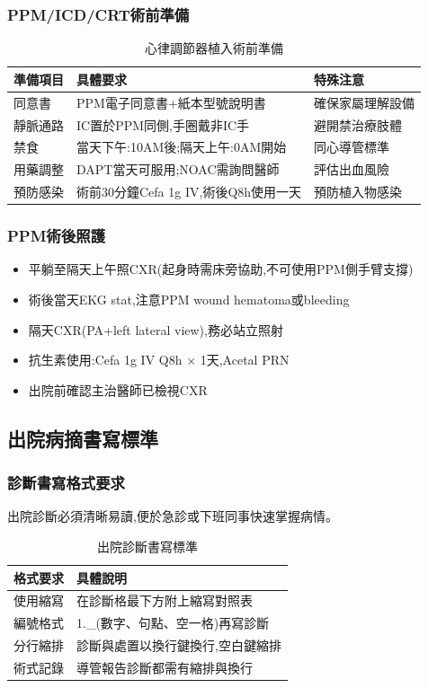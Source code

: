 \documentclass[12pt,a4paper]{article}
\begin{document}
\subsubsection{PPM/ICD/CRT術前準備}
\begin{table}[h]
    \centering
    \caption{心律調節器植入術前準備}
    \begin{tabular}{p{4cm} p{8cm} p{4cm}}
        \toprule
        \textbf{準備項目} & \textbf{具體要求} & \textbf{特殊注意} \\
        \midrule
        同意書 & PPM電子同意書+紙本型號說明書 & 確保家屬理解設備 \\
        靜脈通路 & IC置於PPM同側,手圈戴非IC手 & 避開禁治療肢體 \\
        禁食 & 當天下午:10AM後;隔天上午:0AM開始 & 同心導管標準 \\
        用藥調整 & DAPT當天可服用;NOAC需詢問醫師 & 評估出血風險 \\
        預防感染 & 術前30分鐘Cefa 1g IV,術後Q8h使用一天 & 預防植入物感染 \\
        \bottomrule
    \end{tabular}
\end{table}

\subsubsection{PPM術後照護}
\begin{itemize}[nosep]
    \item 平躺至隔天上午照CXR(起身時需床旁協助,不可使用PPM側手臂支撐)
    \item 術後當天EKG stat,注意PPM wound hematoma或bleeding
    \item 隔天CXR(PA+left lateral view),務必站立照射
    \item 抗生素使用:Cefa 1g IV Q8h × 1天,Acetal PRN
    \item 出院前確認主治醫師已檢視CXR
\end{itemize}

\subsection{出院病摘書寫標準}
\subsubsection{診斷書寫格式要求}
出院診斷必須清晰易讀,便於急診或下班同事快速掌握病情。

\begin{table}[h]
    \centering
    \caption{出院診斷書寫標準}
    \begin{tabular}{p{4cm} p{10cm}}
        \toprule
        \textbf{格式要求} & \textbf{具體說明} \\
        \midrule
        使用縮寫 & 在診斷格最下方附上縮寫對照表 \\
        編號格式 & 1.\_(數字、句點、空一格)再寫診斷 \\
        分行縮排 & 診斷與處置以換行鍵換行,空白鍵縮排 \\
        術式記錄 & 導管報告診斷都需有縮排與換行 \\
        \bottomrule
    \end{tabular}
\end{table}
\end{document}
